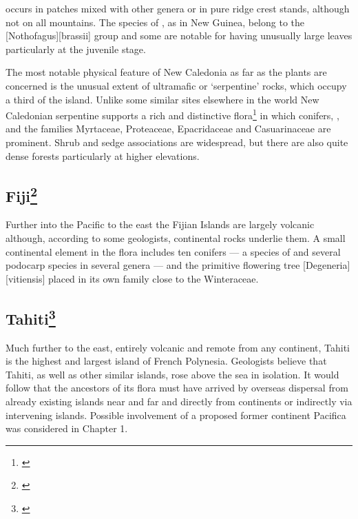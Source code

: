  occurs in patches mixed with other genera or in pure ridge crest stands, although not on all mountains.
The species of , as in New Guinea, belong to the [Nothofagus][brassii] group and some are notable for having unusually large leaves particularly at the juvenile stage.

The most notable physical feature of New Caledonia as far as the plants are concerned is the unusual extent of ultramafic or `serpentine' rocks, which occupy a third of the island.
Unlike some similar sites elsewhere in the world New Caledonian serpentine supports a rich and distinctive flora\footnote{\cite{moratph1986affinites}} in which conifers, , and the families Myrtaceae, Proteaceae, Epacridaceae and Casuarinaceae are prominent.
Shrub and sedge associations are widespread, but there are also quite dense forests particularly at higher elevations.

\subsection[Fiji]{Fiji\thinspace\footnote{\cite{carlquist1965island}}}

Further into the Pacific to the east the Fijian Islands are largely volcanic although, according to some geologists, continental rocks underlie them.
A small continental element in the flora includes ten conifers --- a species of  and several podocarp species in several genera --- and the primitive flowering tree [Degeneria][vitiensis] placed in its own family close to the Winteraceae.

\subsection[Tahiti]{Tahiti\thinspace\footnote{\cite{carlquist1965island}}}

Much further to the east, entirely volcanic and remote from any continent, Tahiti is the highest and largest island of French Polynesia.
Geologists believe that Tahiti, as well as other similar islands, rose above the sea in isolation.
It would follow that the ancestors of its flora must have arrived by overseas dispersal from already existing islands near and far and directly from continents or indirectly via intervening islands.
Possible involvement of a proposed former continent Pacifica was considered in Chapter 1.

